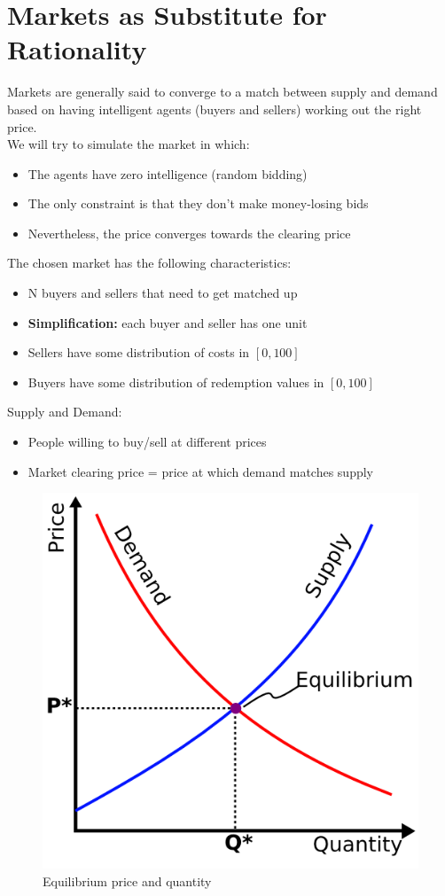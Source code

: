 \documentclass[10pt,a4paper,oneside]{report}
\begin{document}
\section{Markets as Substitute for Rationality}
Markets are generally said to converge to a match between supply and demand based on having intelligent agents (buyers and sellers) working out the right price.\\
\noindent We will try to simulate the market in which:
\begin{itemize}
\item The agents have zero intelligence (random bidding)
\item The only constraint is that they don't make money-losing bids
\item Nevertheless, the price converges towards the clearing price
\end{itemize}
The chosen market has the following characteristics:
\begin{itemize}
\item N buyers and sellers that need to get matched up
\item \textbf{Simplification:} each buyer and seller has one unit
\item Sellers have some distribution of costs in $[0,100]$
\item Buyers have some distribution of redemption values in $[0,100]$\citep{du2016bilateral}
\end{itemize}
Supply and Demand:
\begin{itemize}
\item People willing to buy/sell at different prices 
\item Market clearing price = price at which demand matches supply
\end{itemize}

\begin{figure}[H]
\centering
\includegraphics[scale=0.4]{supply&demand.jpg}
\caption{Equilibrium price and quantity \citep{gjerstad1998price}}
\label{fig:univerise}
\end{figure}
\end{document}
